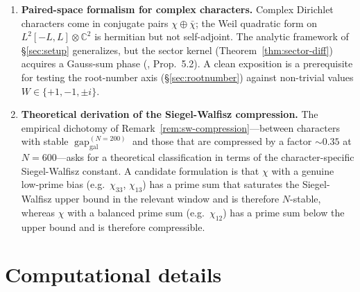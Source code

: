\documentclass[10pt,twocolumn]{article}
\theoremstyle{definition}
\theoremstyle{remark}
\newcommand{\gap}{\operatorname{gap}}
\newcommand{\chifn}{\chi}
\begin{document}
\begin{enumerate}
    of CCX13 compute per ten characters, a one-weekend job.
  \item \textbf{Paired-space formalism for complex characters.}
    Complex Dirichlet characters come in conjugate pairs
    $\chifn\oplus\bar\chifn$; the Weil quadratic form on
    $L^2[-L,L]\otimes\mathbb{C}^2$ is hermitian but not
    self-adjoint. The analytic framework of \S\ref{sec:setup}
    generalizes, but the sector kernel
    (Theorem~\ref{thm:sector-diff}) acquires a Gauss-sum phase
    (\cite{AnalyticKernel}, Prop.~5.2). A clean exposition is
    a prerequisite for testing the root-number axis
    (\S\ref{sec:rootnumber}) against non-trivial values $W\in
    \{+1,-1,\pm i\}$.
  \item \textbf{Theoretical derivation of the Siegel-Walfisz
    compression.} The empirical dichotomy of
    Remark~\ref{rem:sw-compression}---between characters with
    stable $\gap_{\mathrm{gal}}^{(N=200)}$ and those that are
    compressed by a factor $\sim 0.35$ at $N=600$---asks for a
    theoretical classification in terms of the character-specific
    Siegel-Walfisz constant. A candidate formulation is that
    $\chifn$ with a genuine low-prime bias (e.g.\ $\chifn_{33}$,
    $\chifn_{13}$) has a prime sum that saturates the
    Siegel-Walfisz upper bound in the relevant window and is
    therefore $N$-stable, whereas $\chifn$ with a balanced prime
    sum (e.g.\ $\chifn_{12}$) has a prime sum below the upper
    bound and is therefore compressible.
\end{enumerate}

\appendix

\section{Computational details}
\label{app:computation}
\end{document}
